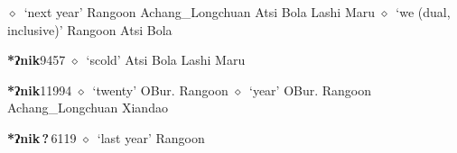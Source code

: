 \begin{list}{}{\leftmargin=1.5em \itemindent=-1.5em}
         $\diamond$~`next year'
         Rangoon 
\hspace{1ex}
         Achang\_Longchuan 
\hspace{1ex}
         Atsi 
\hspace{1ex}
         Bola 
\hspace{1ex}
         Lashi 
\hspace{1ex}
         Maru 
\hspace{1ex}
         $\diamond$~`we (dual, inclusive)'
         Rangoon 
\hspace{1ex}
         Atsi 
\hspace{1ex}
         Bola 
  \item {\footnotesize \textbf{*ʔnik}}{\tiny 9457}
\hspace{1ex}
         $\diamond$~`scold'
         Atsi 
\hspace{1ex}
         Bola 
\hspace{1ex}
         Lashi 
\hspace{1ex}
         Maru 
  \item {\footnotesize \textbf{*ʔnik}}{\tiny 11994}
\hspace{1ex}
         $\diamond$~`twenty'
         OBur. 
\hspace{1ex}
         Rangoon 
\hspace{1ex}
         $\diamond$~`year'
         OBur. 
\hspace{1ex}
         Rangoon 
\hspace{1ex}
         Achang\_Longchuan 
\hspace{1ex}
         Xiandao 
  \item {\footnotesize \textbf{*ʔnik\,?\,}}{\tiny 6119}
\hspace{1ex}
         $\diamond$~`last year'
         Rangoon 

\end{list}
